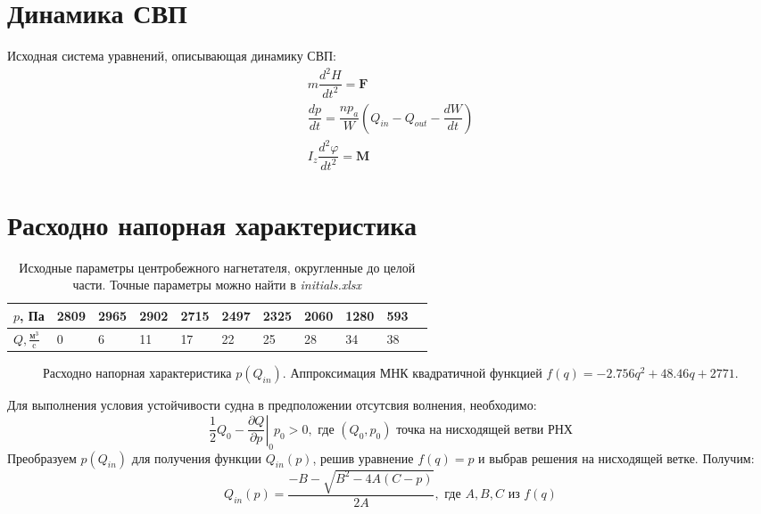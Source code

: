 \documentclass{article}%
\newcommand\at[2]{\left.#1\right|_{#2}}
\numberwithin{equation}{subsection}
\let\oldsection\section%
\renewcommand{\section}{%
  \renewcommand{\theequation}{\thesection.\arabic{equation}}%
  \oldsection}%
\begin{document}
\section{Динамика СВП}
Исходная система уравнений, описывающая динамику СВП:
\begin{equation}
\begin{gathered}
    m\dfrac{d^2H}{dt^2}=\mathbf{F}\\
    \dfrac{dp}{dt}=\dfrac{np_a}{W}\left(Q_{in} - Q_{out} -\dfrac{dW}{dt}\right)\\
    I_z\dfrac{d^2\varphi}{dt^2}=\mathbf{M}
\end{gathered}
\label{eq:1.1}
\end{equation}

\section{Расходно напорная характеристика}
\begin{table}[h]
    \caption{Исходные параметры центробежного нагнетателя, округленные до целой части. Точные параметры можно найти в {\it initials.xlsx}}
    \centering
    \begin{tabular}{@{}l*{10}{l}@{}}
        \toprule
        $p$, Па & 2809 & 2965 & 2902 & 2715 & 2497 & 2325 & 2060 & 1280 & 593 \\
        \midrule
        $Q, \frac{\text{м}^3}{\text{c}}$ & 0 & 6 & 11 & 17 & 22 & 25 & 28 & 34 & 38 \\
        \bottomrule
    \end{tabular}
\end{table}
\begin{figure}[H]
    \centering
    
    \caption{Расходно напорная характеристика $p(Q_{in})$. Аппроксимация МНК квадратичной функцией $f(q)=-2.756q^2 + 48.46q + 2771$.}
\end{figure}
Для выполнения условия устойчивости судна в предположении отсутсвия волнения, необходимо:
\begin{equation}
    \dfrac{1}{2}Q_0 - \at{\dfrac{\partial Q}{\partial p}}{0}p_0 > 0, \text{ где } (Q_0, p_0) \text{ точка на нисходящей ветви РНХ}
\end{equation} 
Преобразуем $p(Q_{in})$ для получения функции $Q_{in}(p)$, решив уравнение $f(q)=p$ и выбрав решения на нисходящей ветке. Получим:
\begin{equation}
    Q_{in}(p)=\dfrac{-B-\sqrt{B^2-4A(C-p)}}{2A}, \text{ где } A, B, C \text{ из } f(q)
\end{equation}
\end{document}
